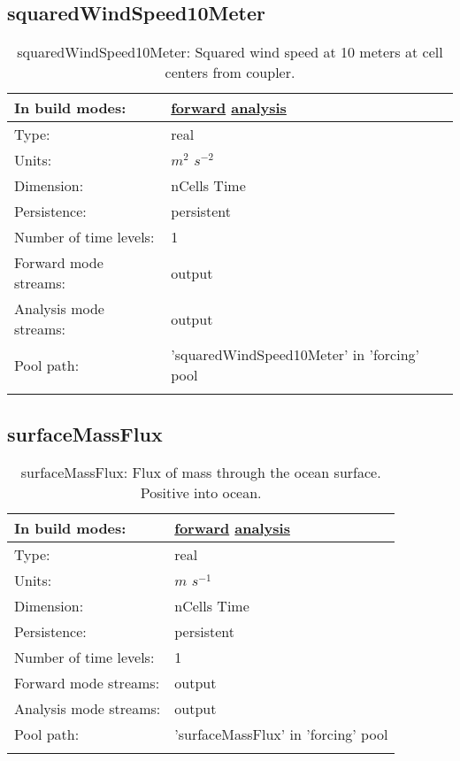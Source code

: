 \subsection[squaredWindSpeed10Meter]{squaredWindSpeed10Meter}
\label{subsec:var_sec_forcing_squaredWindSpeed10Meter}
\begin{center}
\begin{longtable}{| p{2.0in} | p{4.0in} |}
        \hline 
        In build modes: & \hyperref[subsec:forward_var_tab_forcing]{forward} \hyperref[subsec:analysis_var_tab_forcing]{analysis} \\
        \hline 
        Type: & real \\
        \hline 
        Units: & $m^2$ $s^{-2}$ \\
        \hline 
        Dimension: & nCells Time \\
        \hline 
        Persistence: & persistent \\
        \hline 
        Number of time levels: & 1 \\
        \hline 
		 Forward mode streams: &  output \\
        \hline 
		 Analysis mode streams: &  output \\
        \hline 
            Pool path: & 'squaredWindSpeed10Meter' in 'forcing' pool
 \\
		 \hline 
    \caption{squaredWindSpeed10Meter: Squared wind speed at 10 meters at cell centers from coupler.}
\end{longtable}
\end{center}
\subsection[surfaceMassFlux]{surfaceMassFlux}
\label{subsec:var_sec_forcing_surfaceMassFlux}
\begin{center}
\begin{longtable}{| p{2.0in} | p{4.0in} |}
        \hline 
        In build modes: & \hyperref[subsec:forward_var_tab_forcing]{forward} \hyperref[subsec:analysis_var_tab_forcing]{analysis} \\
        \hline 
        Type: & real \\
        \hline 
        Units: & $m$ $s^{-1}$ \\
        \hline 
        Dimension: & nCells Time \\
        \hline 
        Persistence: & persistent \\
        \hline 
        Number of time levels: & 1 \\
        \hline 
		 Forward mode streams: &  output \\
        \hline 
		 Analysis mode streams: &  output \\
        \hline 
            Pool path: & 'surfaceMassFlux' in 'forcing' pool
 \\
		 \hline 
    \caption{surfaceMassFlux: Flux of mass through the ocean surface. Positive into ocean.}
\end{longtable}
\end{center}
